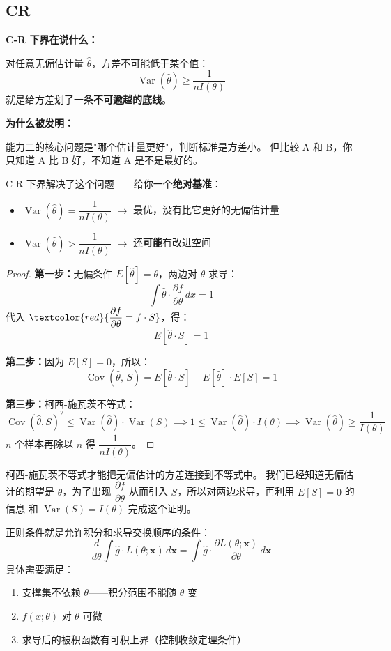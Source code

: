 \subsection{CR}
\begin{note}
\textbf{C-R 下界在说什么：}

对任意无偏估计量 $\hat{\theta}$，方差不可能低于某个值：
$$\operatorname{Var}(\hat{\theta}) \geq \frac{1}{nI(\theta)}$$
就是给方差划了一条\textbf{不可逾越的底线}。
\end{note}

\begin{note}
\textbf{为什么被发明：}

能力二的核心问题是"哪个估计量更好"，判断标准是方差小。
但比较 A 和 B，你只知道 A 比 B 好，不知道 A 是不是最好的。

C-R 下界解决了这个问题——给你一个\textbf{绝对基准}：
\begin{itemize}
  \item $\operatorname{Var}(\hat{\theta}) = \dfrac{1}{nI(\theta)}$ $\to$ 最优，没有比它更好的无偏估计量
  \item $\operatorname{Var}(\hat{\theta}) > \dfrac{1}{nI(\theta)}$ $\to$ 还\textbf{可能}有改进空间
\end{itemize}
\end{note}
\newpage
\begin{proof}
    \textbf{第一步：}无偏条件 $E[\hat{\theta}] = \theta$，两边对 $\theta$ 求导：
$$\int \hat{\theta}\cdot\frac{\partial f}{\partial\theta}\,dx = 1$$
代入 $\textcolor{red}{\dfrac{\partial f}{\partial\theta} = f\cdot S}$，得：
$$E[\hat{\theta}\cdot S] = 1$$

\textbf{第二步：}因为 $E[S]=0$，所以：
$$\operatorname{Cov}(\hat{\theta},\, S) = E[\hat{\theta}\cdot S] - E[\hat{\theta}]\cdot E[S] = 1$$

\textbf{第三步：}柯西-施瓦茨不等式：
$$\operatorname{Cov}(\hat{\theta},S)^2 \leq \operatorname{Var}(\hat{\theta})\cdot\operatorname{Var}(S) \implies 1 \leq \operatorname{Var}(\hat{\theta})\cdot I(\theta) \implies \operatorname{Var}(\hat{\theta}) \geq \frac{1}{I(\theta)}$$
$n$ 个样本再除以 $n$ 得 $\dfrac{1}{nI(\theta)}$。
\end{proof}
\begin{dxtips}
柯西-施瓦茨不等式才能把无偏估计的方差连接到不等式中。
我们已经知道无偏估计的期望是 $\theta$，为了出现 $\dfrac{\partial f}{\partial\theta}$
从而引入 $S$，所以对两边求导，再利用 $E[S]=0$ 的信息
和 $\operatorname{Var}(S) = I(\theta)$ 完成这个证明。
\end{dxtips}
\begin{note}[正则条件]
正则条件就是允许积分和求导交换顺序的条件：
$$\frac{d}{d\theta}\int \hat{g}\cdot L(\theta;\boldsymbol{x})\,d\boldsymbol{x} = \int \hat{g}\cdot \frac{\partial L(\theta;\boldsymbol{x})}{\partial\theta}\,d\boldsymbol{x}$$
具体需要满足：
\begin{enumerate}
    \item 支撑集不依赖 $\theta$——积分范围不能随 $\theta$ 变
    \item $f(x;\theta)$ 对 $\theta$ 可微
    \item 求导后的被积函数有可积上界（控制收敛定理条件）
\end{enumerate}
\end{note}
